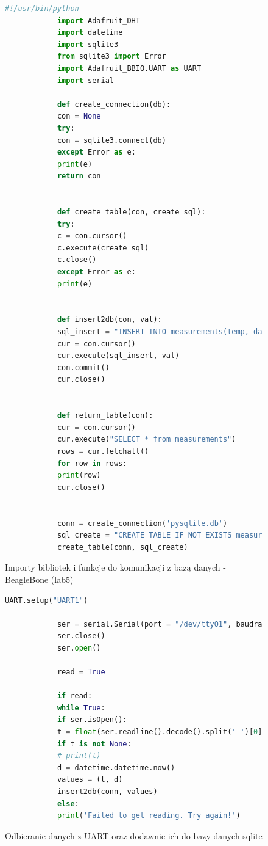 \documentclass[polish,a4paper]{article}
\begin{document}
	
	\newpage
	
	\begin{figure}[h!]
		\begin{lstlisting}[language=Python]
			#!/usr/bin/python
			import Adafruit_DHT
			import datetime
			import sqlite3
			from sqlite3 import Error
			import Adafruit_BBIO.UART as UART
			import serial
			
			def create_connection(db):
			con = None
			try:
			con = sqlite3.connect(db)
			except Error as e:
			print(e)
			return con
			
			
			def create_table(con, create_sql):
			try:
			c = con.cursor()
			c.execute(create_sql)
			c.close()
			except Error as e:
			print(e)
			
			
			def insert2db(con, val):
			sql_insert = "INSERT INTO measurements(temp, date) VALUES(?,?)"
			cur = con.cursor()
			cur.execute(sql_insert, val)
			con.commit()
			cur.close()
			
			
			def return_table(con):
			cur = con.cursor()
			cur.execute("SELECT * from measurements")
			rows = cur.fetchall()
			for row in rows:
			print(row)
			cur.close()
			
			
			conn = create_connection('pysqlite.db')
			sql_create = "CREATE TABLE IF NOT EXISTS measurements (id INTEGER PRIMARY KEY AUTOINCREMENT, temp REAL, date TIMESTAMP);"
			create_table(conn, sql_create)    
		\end{lstlisting}
		\caption*{Importy bibliotek i funkcje do komunikacji z bazą danych - BeagleBone (lab5)}
	\end{figure}
	
	\newpage
	
	\begin{figure}[h!]
		\begin{lstlisting}[language=Python]
			UART.setup("UART1")
			
			ser = serial.Serial(port = "/dev/ttyO1", baudrate=9600)
			ser.close()
			ser.open()
			
			read = True
			
			if read:
			while True:
			if ser.isOpen():
			t = float(ser.readline().decode().split(' ')[0])  # byte strings to unicode
			if t is not None:
			# print(t)
			d = datetime.datetime.now()
			values = (t, d)
			insert2db(conn, values)
			else:
			print('Failed to get reading. Try again!')
		\end{lstlisting}
		\caption*{Odbieranie danych z UART oraz dodawnie ich do bazy danych sqlite}
	\end{figure}
	
\end{document}
